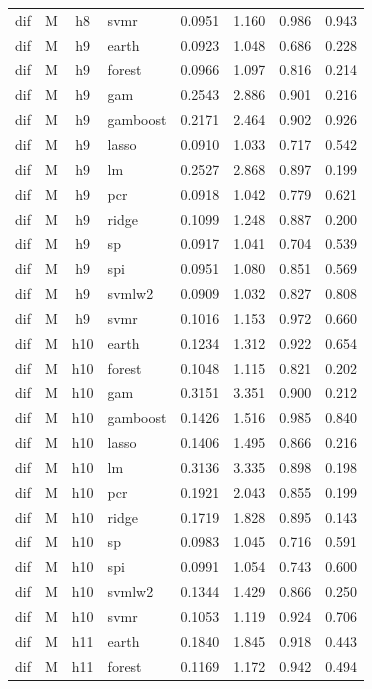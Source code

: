 \begin{ThreePartTable}
\begin{longtable}[t]{llclcccc}
dif & M & h8 & svmr & 0.0951 & 1.160 & 0.986 & 0.943\\
\addlinespace
dif & M & h9 & earth & 0.0923 & 1.048 & 0.686 & 0.228\\
dif & M & h9 & forest & 0.0966 & 1.097 & 0.816 & 0.214\\
dif & M & h9 & gam & 0.2543 & 2.886 & 0.901 & 0.216\\
dif & M & h9 & gamboost & 0.2171 & 2.464 & 0.902 & 0.926\\
dif & M & h9 & lasso & 0.0910 & 1.033 & 0.717 & 0.542\\
dif & M & h9 & lm & 0.2527 & 2.868 & 0.897 & 0.199\\
dif & M & h9 & pcr & 0.0918 & 1.042 & 0.779 & 0.621\\
dif & M & h9 & ridge & 0.1099 & 1.248 & 0.887 & 0.200\\
dif & M & h9 & sp & 0.0917 & 1.041 & 0.704 & 0.539\\
dif & M & h9 & spi & 0.0951 & 1.080 & 0.851 & 0.569\\
dif & M & h9 & svmlw2 & 0.0909 & 1.032 & 0.827 & 0.808\\
dif & M & h9 & svmr & 0.1016 & 1.153 & 0.972 & 0.660\\
\addlinespace
dif & M & h10 & earth & 0.1234 & 1.312 & 0.922 & 0.654\\
dif & M & h10 & forest & 0.1048 & 1.115 & 0.821 & 0.202\\
dif & M & h10 & gam & 0.3151 & 3.351 & 0.900 & 0.212\\
dif & M & h10 & gamboost & 0.1426 & 1.516 & 0.985 & 0.840\\
dif & M & h10 & lasso & 0.1406 & 1.495 & 0.866 & 0.216\\
dif & M & h10 & lm & 0.3136 & 3.335 & 0.898 & 0.198\\
dif & M & h10 & pcr & 0.1921 & 2.043 & 0.855 & 0.199\\
dif & M & h10 & ridge & 0.1719 & 1.828 & 0.895 & 0.143\\
dif & M & h10 & sp & 0.0983 & 1.045 & 0.716 & 0.591\\
dif & M & h10 & spi & 0.0991 & 1.054 & 0.743 & 0.600\\
dif & M & h10 & svmlw2 & 0.1344 & 1.429 & 0.866 & 0.250\\
dif & M & h10 & svmr & 0.1053 & 1.119 & 0.924 & 0.706\\
\addlinespace
dif & M & h11 & earth & 0.1840 & 1.845 & 0.918 & 0.443\\
dif & M & h11 & forest & 0.1169 & 1.172 & 0.942 & 0.494\\

\end{longtable}
\end{ThreePartTable}
